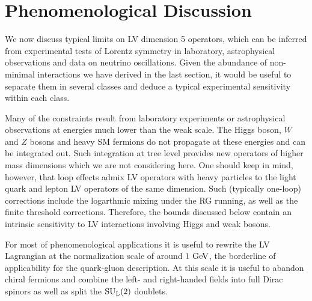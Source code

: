 \documentclass[12pt,preprintnumbers,nofootinbib]{revtex4}
\newcommand{\sul}{{{\rm SU}_{\rm L}(2)}}
\newcommand{\GeV}{{\rm GeV}}
\begin{document}
%
%
\section{Phenomenological Discussion}
\label{phenomenology}

	We now discuss typical limits on LV dimension 5 operators, 
	which can be inferred from experimental tests 
	of Lorentz symmetry in laboratory, astrophysical observations and
	data on neutrino oscillations.
	Given the abundance of non-minimal interactions we have derived in 
	the last section, it would be useful to separate them in several classes 
    and deduce a typical experimental sensitivity within each class.
	
	Many of the constraints result from laboratory experiments
	or astrophysical observations at energies much lower
	than the weak scale. 
	The Higgs boson, $W$ and $Z$  bosons and heavy SM fermions 
    do not propagate 
	at these energies and can be integrated out.  Such integration at tree level 
    provides new operators of 
	higher mass dimensions which we are not considering here.
	One should keep in mind, however, that loop effects
	admix LV operators with heavy particles to the light quark and lepton 
    LV operators of the same dimension. Such (typically one-loop) corrections 
    include the logarthmic mixing under the RG running,
    as well as the finite threshold corrections. 
	Therefore, the bounds discussed below contain an intrinsic sensitivity to LV 
	interactions involving Higgs and weak bosons. 
	

	For most of phenomenological applications it 
 is useful to rewrite the LV  Lagrangian at the normalization scale of
	around $ 1~\GeV $, the borderline of applicability for the quark-gluon description.
	At this scale it is useful to abandon chiral fermions and combine the left- and right-handed
fields into
	full Dirac spinors as well as split the
	$ \sul $ doublets. 
	
\end{document}
